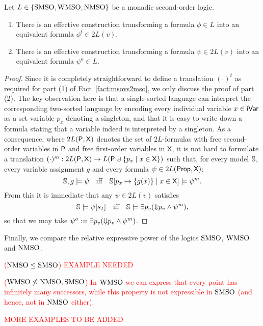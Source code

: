 \begin{proposition}
\label{p:msovs2mso}
Let $L \in \{\mathrm{SMSO}, \mathrm{WMSO}, \mathrm{NMSO}\}$ be a monadic second-order logic.
\begin{enumerate}
\item
There is an effective construction transforming a formula $\phi \in L$ into
an equivalent formula $\phi^{t} \in 2L(v)$.
\item
There is an effective construction transforming a formula $\psi \in 2L(v)$ into
an equivalent formula $\psi^{o} \in L$.
\end{enumerate}
\end{proposition}

\begin{proof}
Since it is completely straightforward to define a translation $(\cdot)^{t}$ as 
required for part (1) of Fact~\ref{fact:msovs2mso}, we only discuss the proof 
of part (2). 
The key observation here is that a single-sorted language can interpret the 
corresponding two-sorted language by encoding every individual variable $x \in 
\mathsf{iVar}$ as a set variable $p_x$ denoting a singleton, and that it is easy to 
write down a formula stating that a variable indeed is interpreted by a 
singleton.
As a consequence, where $2L(\mathsf{P},\mathsf{X})$ denotes the set of
$2L$-formulas with free second-order variables in $\mathsf{P}$ and free first-order
variables in $\mathsf{X}$, it is not hard to formulate a translation 
$(\cdot)^{m} : 2L(\mathsf{P},\mathsf{X}) \to L(\mathsf{P} \uplus 
\{ p_{x} \mid x \in \mathsf{X} \})$
such that, for every model $\mathbb{S}$, every variable assignment $g$ and every
formula $\psi \in 2L(\mathsf{Prop},\mathsf{X})$:
\[
\bbS,g \models \psi \quad\text{iff}\quad 
\bbS[p_{x} \mapsto \{g(x)\} \mid x \in \mathsf{X}] \models \psi^m.
\]
From this it is immediate that any $\psi \in 2L(v)$ satisfies
\[
\bbS \models \psi[s_{I}]
\quad\text{iff}\quad 
\bbS \models \exists p_{v} (\here{p_{v}} \land \psi^{m}),
\]
so that we may take $\psi^{o} \mathrel{:=} \exists p_{v} ({\Downarrow}p_{v} \land 
\psi^{m})$.
\end{proof}

Finally, we compare the relative expressive power of the logics $\mathrm{SMSO}$, $\mathrm{WMSO}$
and $\mathrm{NMSO}$.

\begin{example}
\btbs
\item \textcolor{red}{($\mathrm{NMSO} \leq \mathrm{SMSO}$) EXAMPLE NEEDED}
\item
\textcolor{red}{($\mathrm{WMSO} \not\leq \mathrm{NMSO},\mathrm{SMSO}$) 
In $\mathrm{WMSO}$ we can express that every point has infinitely many successors, while
this property is not expressible in $\mathrm{SMSO}$ (and hence, not in $\mathrm{NMSO}$ either).
}
\item \textcolor{red}{MORE EXAMPLES TO BE ADDED}
\etbs
\end{example}

